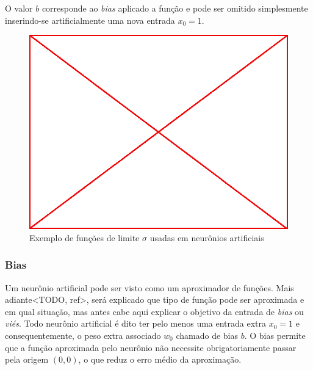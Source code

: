 O valor $b$ corresponde ao \emph{bias} aplicado a função e pode ser omitido
simplesmente inserindo-se artificialmente uma nova entrada $x_0 = 1$.

\begin{figure}
\label{fig:lim-fun}
  \caption{Exemplo de funções de limite $\sigma$ usadas em neurônios artificiais}
  \begin{center}
    \includegraphics[scale=0.5]{placeholder}
  \end{center}
\end{figure}

\subsubsection{Bias}

Um neurônio artificial pode ser visto como um aproximador de funções. Mais
adiante<TODO, ref>, será explicado que tipo de função pode ser aproximada e em
qual situação, mas antes cabe aqui explicar o objetivo da entrada de
\emph{bias} ou \emph{viés}. Todo neurônio artificial é dito ter pelo menos uma
entrada extra $x_0 = 1$ e consequentemente, o peso extra associado $w_0$
chamado de bias $b$. O bias permite que a função aproximada pelo neurônio não
necessite obrigatoriamente passar pela origem $(0,0)$, o que reduz o erro médio
da aproximação.

